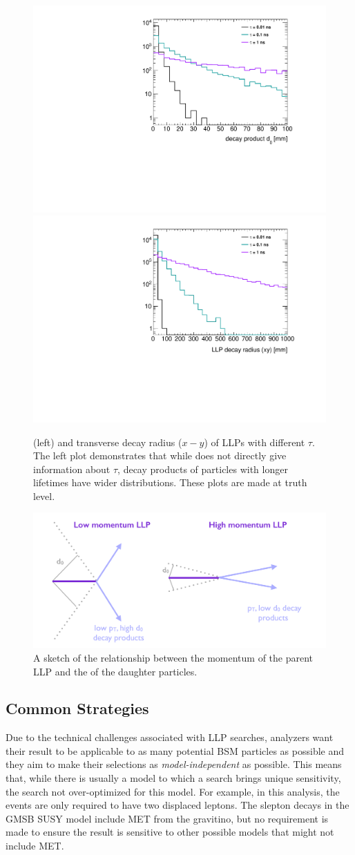 \begin{figure}[!h]
\centering
\includegraphics[width=.48\textwidth]{figures/theory/signal_d0.pdf}
\includegraphics[width=.48\textwidth]{figures/theory/signal_rxy.pdf}
\caption{\dzero (left) and transverse decay radius ($x-y$) of \ac{LLP}s with different $\tau$. The left plot demonstrates that while \dzero does not directly give information about $\tau$, decay products of particles with longer lifetimes have wider \dzero distributions. These plots are made at truth level.}
\label{fig:d0-rltns}
\end{figure}

\begin{figure}[!h]
\centering
\includegraphics[width=.6\textwidth]{figures/theory/pt-d0.png}
\caption{A sketch of the relationship between the momentum of the parent \ac{LLP} and the \dz of the daughter particles.}
\label{fig:d0-pt}
\end{figure}

\subsection{Common Strategies}

Due to the technical challenges associated with \ac{LLP} searches, analyzers want their result to be applicable to as many potential \ac{BSM} particles as possible and they aim to make their selections as \emph{model-independent} as possible. This means that, while there is usually a model to which a search brings unique sensitivity, the search not over-optimized for this model. For example, in this analysis, the events are only required to have two displaced leptons. The slepton decays in the \ac{GMSB} \ac{SUSY} model include \ac{MET} from the gravitino, but no requirement is made to ensure the result is sensitive to other possible models that might not include \ac{MET}.




